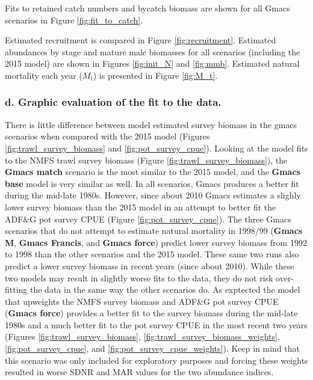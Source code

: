 \documentclass[]{article}
\begin{document}
Fits to retained catch numbers and bycatch biomass are shown for all
Gmacs scenarios in Figure \ref{fig:fit_to_catch}.

Estimated recruitment is compared in Figure \ref{fig:recruitment}.
Estimated abundances by stage and mature male biomasses for all
scenarios (including the 2015 model) are shown in Figures
\ref{fig:init_N} and \ref{fig:mmb}. Estimated natural mortality each
year (\(M_t\)) is presented in Figure \ref{fig:M_t}.

\subsubsection{d. Graphic evaluation of the fit to the
data.}\label{d.-graphic-evaluation-of-the-fit-to-the-data.}

There is little difference between model estimated survey biomass in the
gmacs scenarios when compared with the 2015 model (Figures
\ref{fig:trawl_survey_biomass} and \ref{fig:pot_survey_cpue}). Looking
at the model fits to the NMFS trawl survey biomass (Figure
\ref{fig:trawl_survey_biomass}), the \textbf{Gmacs match} scenario is
the most similar to the 2015 model, and the \textbf{Gmacs base} model is
very similar as well. In all scenarios, Gmacs produces a better fit
during the mid-late 1980s. However, since about 2010 Gmacs estimates a
slighly lower survey biomass than the 2015 model in an attempt to better
fit the ADF\&G pot survey CPUE (Figure \ref{fig:pot_survey_cpue}). The
three Gmacs scenarios that do not attempt to estimate natural mortality
in 1998/99 (\textbf{Gmacs M}, \textbf{Gmacs Francis}, and \textbf{Gmacs
force}) predict lower survey biomass from 1992 to 1998 than the other
scenarios and the 2015 model. These same two runs also predict a lower
survey biomass in recent years (since about 2010). While these two
models may result in slightly worse fits to the data, they do not risk
over-fitting the data in the same way the other scenarios do. As
exptected the model that upweights the NMFS survey biomass and ADF\&G
pot survey CPUE (\textbf{Gmacs force}) provides a better fit to the
survey biomass during the mid-late 1980s and a much better fit to the
pot survey CPUE in the most recent two years (Figures
\ref{fig:trawl_survey_biomass}, \ref{fig:trawl_survey_biomass_weights},
\ref{fig:pot_survey_cpue}, and \ref{fig:pot_survey_cpue_weights}). Keep
in mind that this scenario was only included for exploratory purposes
and forcing these weights resulted in worse SDNR and MAR values for the
two abundance indices.
\end{document}

